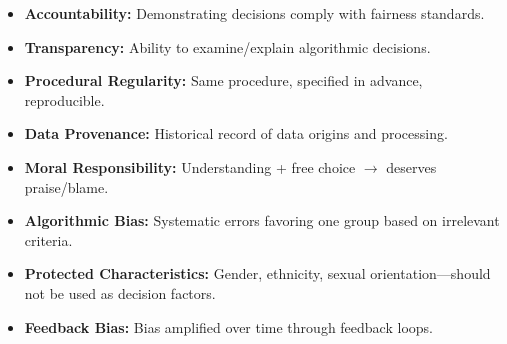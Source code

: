 \begin{defbox}
\begin{itemize}
  \item \textbf{Accountability:} Demonstrating decisions comply with fairness standards.
  \item \textbf{Transparency:} Ability to examine/explain algorithmic decisions.
  \item \textbf{Procedural Regularity:} Same procedure, specified in advance, reproducible.
  \item \textbf{Data Provenance:} Historical record of data origins and processing.
  \item \textbf{Moral Responsibility:} Understanding + free choice $\to$ deserves praise/blame.
  \item \textbf{Algorithmic Bias:} Systematic errors favoring one group based on irrelevant criteria.
  \item \textbf{Protected Characteristics:} Gender, ethnicity, sexual orientation---should not be used as decision factors.
  \item \textbf{Feedback Bias:} Bias amplified over time through feedback loops.
\end{itemize}
\end{defbox}

